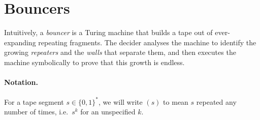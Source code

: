 
\section{Bouncers}\label{sec:bouncers}

Intuitively, a \emph{bouncer} is a Turing machine that builds a tape out of
ever-expanding repeating fragments. The decider analyses the machine to
identify the growing \emph{repeaters} and the \emph{walls} that separate them,
and then executes the machine symbolically to prove that this growth is endless.

\paragraph{Notation.} For a tape segment $s \in \{0, 1\}^*$, we will
write $(s)$ to mean $s$ repeated any number of times, i.e.~$s^k$ for
an unspecified $k$.

